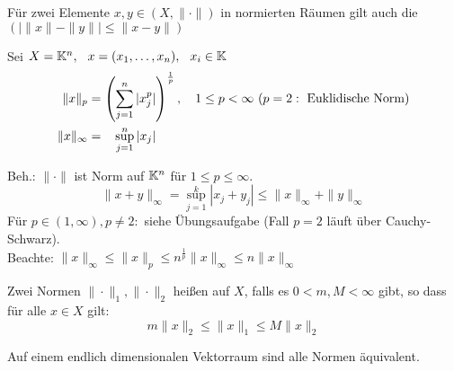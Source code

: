\begin{bemerkung}
Für zwei Elemente $x, y \in (X, \| \cdot \|)$ in normierten Räumen gilt auch die  $( \left| \| x \| - \| y \| \right| \leq \| x - y \|)$
\end{bemerkung}


\begin{beispiel}
Sei $ X = \mathbb{K}^{n}, \hspace{0.25cm} x = ( x_{1}, \dotsc, x_{n}), \hspace{0.25cm} x_{i} \in \mathbb{K}$ 
\begin{align*}
	\| x \|_{p} & = \left( \sum_{j = 1}^{n} |x_{j}^{p}| \right)^{\frac{1}{p}}, \quad 1 \leq p < \infty \text{ } (p = 2: \text{ Euklidische Norm}) \index{Euklidische Norm} \\
	\| x \|_{\infty} & = \hspace{0.3cm} \sup_{j = 1}^{n} |x_{j}|	
\end{align*}

Beh.: $\| \cdot \| $ ist Norm auf $\mathbb{K}^n$ für $1 \leq p \leq \infty$.
\[ \| x + y \|_{\infty} = \sup_{j = 1}^{k} |x_{j} + y_{j}| \leq \|x\|_{\infty} + \|y\|_{\infty} \]
Für $p \in (1, \infty), p \neq 2:$ siehe Übungsaufgabe (Fall $p = 2$ läuft über Cauchy-Schwarz). \\
Beachte: $\|x\|_{\infty} \leq  \|x\|_{p} \leq n^{\frac{1}{p}} \|x\|_{\infty} \leq n \| x \|_{\infty}$
\end{beispiel}


\begin{definition}
	Zwei Normen $\| \cdot \|_{1}, \| \cdot \|_{2}$ hei{\ss}en  auf $X$, falls es $0 < m, M < \infty$ gibt, so dass für alle $ x \in X$ gilt:
	\[ m \| x \|_{2} \leq \| x \|_{1} \leq M \| x \|_{2} \]
\end{definition}
 
 
\begin{satz} 
	Auf einem endlich dimensionalen Vektorraum sind alle Normen äquivalent.
\end{satz}

